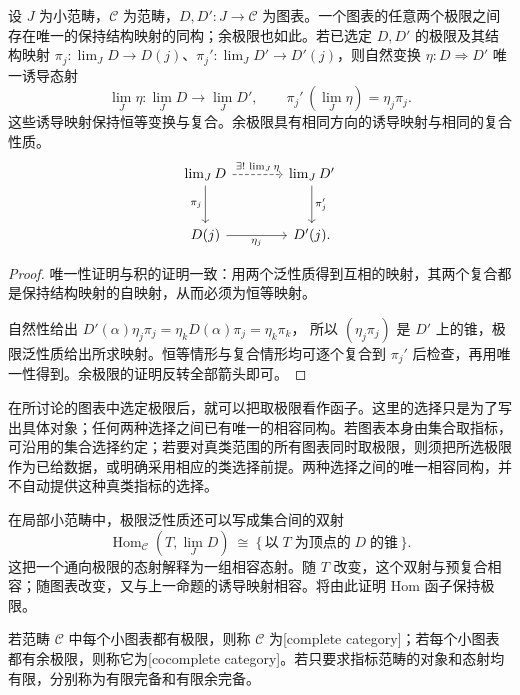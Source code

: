 \begin{proposition}[唯一性与诱导映射]\label{b4:prop:limit-uniqueness-functoriality}
	设 \(J\) 为小范畴，\(\mathcal C\) 为范畴，\(D,D':J\rightarrow\mathcal C\) 为图表。一个图表的任意两个极限之间存在唯一的保持结构映射的同构；余极限也如此。若已选定 \(D,D'\) 的极限及其结构映射 \(\pi_j:\lim_JD\rightarrow D(j)\)、\(\pi_j':\lim_JD'\rightarrow D'(j)\)，则自然变换 \(\eta:D\Rightarrow D'\) 唯一诱导态射
	\[
		\lim_J\eta:\lim_JD\longrightarrow\lim_JD', \qquad \pi_j'\,(\lim_J\eta)=\eta_j\pi_j.
	\]
	这些诱导映射保持恒等变换与复合。余极限具有相同方向的诱导映射与相同的复合性质。
	\[
		\begin{tikzcd}[column sep=large,row sep=large]
			\lim_JD\arrow[r,dashed,"\exists!\,\lim_J\eta"]\arrow[d,"\pi_j"']& \lim_JD'\arrow[d,"\pi_j'"]\\
			D(j)\arrow[r,"\eta_j"']&D'(j).
		\end{tikzcd}
	\]
\end{proposition}
\begin{proof}
	唯一性证明与积的证明一致：用两个泛性质得到互相的映射，其两个复合都是保持结构映射的自映射，从而必须为恒等映射。

	自然性给出 \(D'(\alpha)\eta_j\pi_j=\eta_kD(\alpha)\pi_j=\eta_k\pi_k\)， 所以 \((\eta_j\pi_j)\) 是 \(D'\) 上的锥，极限泛性质给出所求映射。恒等情形与复合情形均可逐个复合到 \(\pi_j'\) 后检查，再用唯一性得到。余极限的证明反转全部箭头即可。
\end{proof}

在所讨论的图表中选定极限后，就可以把取极限看作函子。这里的选择只是为了写出具体对象；任何两种选择之间已有唯一的相容同构。若图表本身由集合取指标，可沿用的集合选择约定；若要对真类范围的所有图表同时取极限，则须把所选极限作为已给数据，或明确采用相应的类选择前提。两种选择之间的唯一相容同构，并不自动提供这种真类指标的选择。

\ProseParagraphBreak
在局部小范畴中，极限泛性质还可以写成集合间的双射
\[
	\operatorname{Hom}_{\mathcal C}(T,\lim_JD) \ \cong\
	\{\,\text{以}\;T\;\text{为顶点的}\;D\;\text{的锥}\,\}.
\]
这把一个通向极限的态射解释为一组相容态射。随 \(T\) 改变，这个双射与预复合相容；随图表改变，又与上一命题的诱导映射相容。将由此证明 Hom 函子保持极限。

\begin{definition}[完备与余完备]\label{b4:def:complete-cocomplete-category}
	若范畴 \(\mathcal C\) 中每个小图表都有极限，则称 \(\mathcal C\) 为[complete category]；若每个小图表都有余极限，则称它为[cocomplete category]。若只要求指标范畴的对象和态射均有限，分别称为有限完备和有限余完备。
\end{definition}

